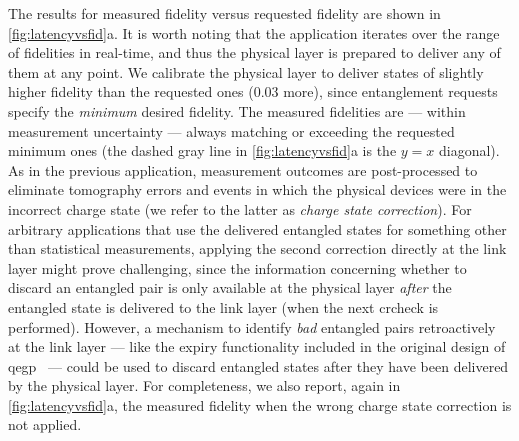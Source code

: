 The results for measured fidelity versus requested fidelity are shown in \cref{fig:latencyvsfid}a.
It is worth noting that the application iterates over the range of fidelities in real-time, and thus
the physical layer is prepared to deliver any of them at any point. We calibrate the physical layer
to deliver states of slightly higher fidelity than the requested ones (\num{0.03} more), since
entanglement requests specify the \emph{minimum} desired fidelity. The measured fidelities are ---
within measurement uncertainty --- always matching or exceeding the requested minimum ones (the
dashed gray line in \cref{fig:latencyvsfid}a is the $y=x$ diagonal). As in the previous application,
measurement outcomes are post-processed to eliminate tomography errors and events in which the
physical devices were in the incorrect charge state (we refer to the latter as \emph{charge state
correction}). For arbitrary applications that use the delivered entangled states for something other
than statistical measurements, applying the second correction directly at the link layer might prove
challenging, since the information concerning whether to discard an entangled pair is only available
at the physical layer \emph{after} the entangled state is delivered to the link layer (when the next
\acrshort{crcheck} is performed). However, a mechanism to identify \emph{bad} entangled pairs
retroactively at the link layer --- like the expiry functionality included in the original design of
\acrshort{qegp}~\cite{dahlberg_2019_egp} --- could be used to discard entangled states after they
have been delivered by the physical layer. For completeness, we also report, again in
\cref{fig:latencyvsfid}a, the measured fidelity when the wrong charge state correction is not
applied.

